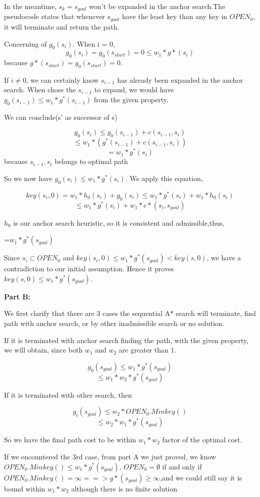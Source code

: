 \documentclass[12pt, letterpaper]{article}
\begin{document}
In the meantime, $ s_k=s_{goal} $ won't be expanded in the anchor search.The pseudocode states that whenever $ s_{goal} $ have the least key than any key in  $ OPEN_0 $, it will terminate and return the path.

Concerning of $ g_0(s_i) $. When i = 0,
$$ g_0(s_i) = g_0(s_{start})=0 \leq w_1 * g*(s_i)$$
because $g*(s_{start})=g_0(s_{start})=0$.

If $i \neq 0$, we can certainly know $ s_{i-1} $ has already been expanded in the anchor search. When chose the $ s_{i-1} $ to expand, we would have $g_0(s_{i-1}) \leq w_1 * g^*(s_{i-1})$ from the given property.

We can conclude(s' as successor of s)

$$g_0(s_i) \leq g_0(s_{i-1})+ c(s_{i-1},s_i)$$
$$\leq w_1 * (g^*(s_{i-1})+ c(s_{i-1},s_i))$$
$$=w_1*g^*(s_i)$$
because $ s_{i-1},s_i $  belongs to optimal path

So we now have $g_0(s_i) \leq w_1*g^*(s_i)$. We apply this equation,

$$key(s_i,0)= w_1*h_0(s_i)+g_0(s_i) \leq w_1 * g^*(s_i) +  w_1 * h_0(s_i)$$
$$ \leq w_1 * g^*(s_i) +  w_1 *c*(s_i,s_{goal})$$

$h_0$ is our anchor search heuristic, so it is consistent and admissible,thus,

=$  w_1*g^*(s_{goal}) $

Since $ s_i \subset OPEN_0$ and $key(s_i,0) \leq w_1*g^*(s_{goal}) < key(s,0)$, we have a contradiction to our initial assumption. Hence it proves  $ key(s,0) \leq w_1 * g^*(s_{goal}) $.

\bigskip

\noindent \textbf{Part B:}

\noindent We first clarify that there are 3 cases the sequential A* search will terminate, find path with anchor search, or by other inadmissible search or no solution.
 
\medskip

\noindent If it is terminated with anchor search finding the path, with the given property, we will obtain, since both $ w_1 $ and $ w_2 $ are greater than 1.

$$g_0(s_{goal}) \leq w_1 * g^*(s_{goal})$$
$$\leq w_1 * w_2 * g^*(s_{goal})$$ 

\medskip

\noindent If it is terminated with other search, then

$$g_i(s_{goal}) \leq w_2 * OPEN_0.Minkey()$$
$$\leq w_2*w_1*g^*(s_{goal})$$

So we have the final path cost to be within $ w_1*w_2 $ factor of the optimal cost.

\medskip 

\noindent If we encountered the 3rd case, from part A we just proved, we know $ OPEN_0.Minkey() \leq w_1 * g^*(s_{goal}) $. $OPEN_0=\emptyset$ if and only if $OPEN_0.Minkey() = \infty ==> g*(s_{goal}) \geq \infty$,and we could still say it is bound within $ w_1*w_2 $ although there is no finite solution. 
\end{document}
